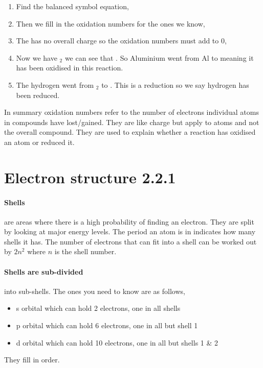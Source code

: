 	\begin{enumerate}
		\item Find the balanced symbol equation,
		
		
		\item Then we fill in the oxidation numbers for the ones we know,
		
		 
		\item The  has no overall charge so the oxidation numbers must add to 0,
		
		
		\item Now we have $_2$ we can see that . So Aluminium went from Al to  meaning it has been oxidised in this reaction.
		
		\item The hydrogen went from $_2$ to . This is a reduction so we say hydrogen has been reduced.
	\end{enumerate}
    In summary oxidation numbers refer to the number of electrons individual atoms in compounds have lost/gained.
	They are like charge but apply to atoms and not the overall compound.
	They are used to explain whether a reaction has oxidised an atom or reduced it.
   \newpage
   \section{Electron structure 2.2.1}

	\paragraph{Shells} are areas where there is a high probability of finding an electron.
	They are split by looking at major energy levels.
	The period an atom is in indicates how many shells it has.
	The number of electrons that can fit into a shell can be worked out by $2n^2$ where $n$ is the shell number.
	
	\paragraph{Shells are sub-divided} into sub-shells. The ones you need to know are as follows,
	\begin{itemize}
		\item s orbital which can hold 2 electrons, one in all shells
		\item p orbital which can hold 6 electrons, one in all but shell 1
		\item d orbital which can hold 10 electrons, one in all but shells 1 \& 2
	\end{itemize}
	They fill in order.
	
